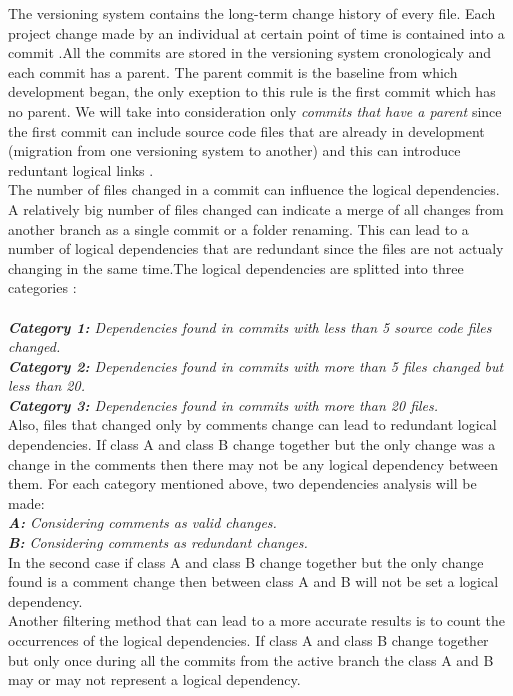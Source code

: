 \tab The versioning system contains the long-term change history of every file. Each project change made by an individual at certain point of time is contained into a commit \cite{ct7}.All the commits are stored in the versioning system cronologicaly and each commit has a parent. The parent commit is the baseline from which development began, the only exeption to this rule is the first commit which has no parent. We will take into consideration only \textit{commits that have a parent} since the first commit can include source code files that are already in development (migration from one versioning system to another) and this can introduce reduntant logical links \cite{ct8} .\\

\tab The number of files changed in a commit can influence the logical dependencies. A relatively big number of files changed can indicate a merge of all changes from another branch as a single commit or a folder renaming. This can lead to a number of logical dependencies that are redundant since the files are not actualy changing in the same time.The logical dependencies are splitted into three categories :\\ \\
\textit{\textbf{Category 1:} Dependencies found in commits with less than 5 source code files changed.}\\
\textit{\textbf{Category 2:} Dependencies found in commits with more than 5 files changed but less than 20. }\\
\textit{\textbf{Category 3:} Dependencies found in commits with more than 20 files.}\\

\tab Also, files that changed only by comments change can lead to redundant logical dependencies. If class A and class B change together but the only change was a change in the comments then there may not be any logical dependency between them. 
For each category mentioned above, two dependencies analysis will be made:\\
\textit{\textbf{A:} Considering comments  as valid changes.}\\
\textit{\textbf{B:} Considering comments  as redundant changes. }\\
In the second case if class A and class B change together but the only change found is a comment change then between class A and B will not be set a logical dependency.\\

\tab Another filtering method that can lead to a more accurate results is to count the occurrences of the logical dependencies. If class A and class B change together but only once during all the commits from the active branch the class A and B may or may not represent a logical dependency.
